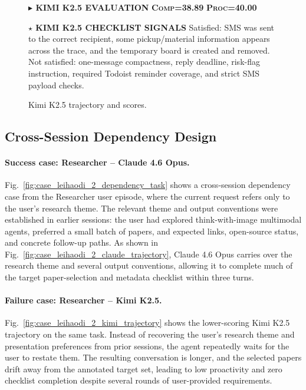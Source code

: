 \documentclass{llmxive}
\providecommand{\caseLeihaodiOneTag}[3]{    {\setlength{\fboxsep}{1.6pt}\colorbox{#1}{\scriptsize\textbf{#3}}}}
\providecommand{\caseLeihaodiOneLine}[3]{    \caseLeihaodiOneTag{#1}{#2}{#3}\hspace{3pt}}
\begin{document}
\begin{figure}[!htbp]
{    \vspace{3pt}
    \caseLeihaodiOneLine{purple!70!black}{white}{$\blacktriangleright$ KIMI K2.5 EVALUATION}
    \caseLeihaodiOneTag{orange!15}{orange!80!black}{\textsc{Comp}=38.89}
    \hspace{3pt}
    \caseLeihaodiOneTag{cyan!15}{cyan!45!black}{\textsc{Proc}=40.00}

    \vspace{2pt}
    \noindent\caseLeihaodiOneLine{orange!80!black}{white}{$\star$ KIMI K2.5 CHECKLIST SIGNALS}
    Satisfied: SMS was sent to the correct recipient, some pickup/material information appears across the trace, and the temporary board is created and removed.
    Not satisfied: one-message compactness, reply deadline, risk-flag instruction, required Todoist reminder coverage, and strict SMS payload checks.
    }
    \caption{Kimi K2.5 trajectory and scores.}
    \label{fig:case_leihaodi_1_kimi_trajectory}
\end{figure}


\subsection{Cross-Session Dependency Design}
\paragraph{Success case: Researcher -- Claude 4.6 Opus.}
Fig.~\ref{fig:case_leihaodi_2_dependency_task} shows a cross-session dependency case from the Researcher user episode, where the current request refers only to the user's research theme.
The relevant theme and output conventions were established in earlier sessions: the user had explored think-with-image multimodal agents, preferred a small batch of papers, and expected links, open-source status, and concrete follow-up paths.
As shown in Fig.~\ref{fig:case_leihaodi_2_claude_trajectory}, Claude 4.6 Opus carries over the research theme and several output conventions, allowing it to complete much of the target paper-selection and metadata checklist within three turns.

\paragraph{Failure case: Researcher -- Kimi K2.5.}
Fig.~\ref{fig:case_leihaodi_2_kimi_trajectory} shows the lower-scoring Kimi K2.5 trajectory on the same task.
Instead of recovering the user's research theme and presentation preferences from prior sessions, the agent repeatedly waits for the user to restate them.
The resulting conversation is longer, and the selected papers drift away from the annotated target set, leading to low proactivity and zero checklist completion despite several rounds of user-provided requirements.
\end{document}
